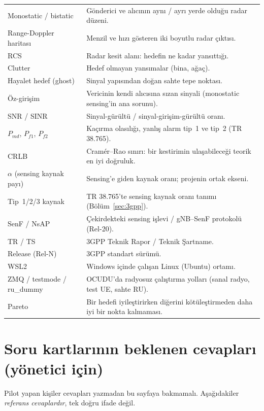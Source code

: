 \begin{xltabular}{\textwidth}{@{}p{3.2cm}X@{}}
Monostatic / bistatic & Gönderici ve alıcının aynı / ayrı yerde olduğu radar düzeni. \\
Range-Doppler haritası & Menzil ve hızı gösteren iki boyutlu radar çıktısı. \\
RCS & Radar kesit alanı: hedefin ne kadar yansıttığı. \\
Clutter & Hedef olmayan yansımalar (bina, ağaç). \\
Hayalet hedef (ghost) & Sinyal yapısından doğan sahte tepe noktası. \\
Öz-girişim & Vericinin kendi alıcısına sızan sinyali (monostatic sensing'in ana sorunu). \\
SNR / SINR & Sinyal-gürültü / sinyal-girişim-gürültü oranı. \\
$P_{md}$, $P_{f1}$, $P_{f2}$ & Kaçırma olasılığı, yanlış alarm tip~1 ve tip~2 (TR 38.765). \\
CRLB & Cramér--Rao sınırı: bir kestirimin ulaşabileceği teorik en iyi doğruluk. \\
$\alpha$ (sensing kaynak payı) & Sensing'e giden kaynak oranı; projenin ortak ekseni. \\
Tip~1/2/3 kaynak & TR 38.765'te sensing kaynak oranı tanımı (Bölüm~\ref{sec:3gpp}). \\
SenF / NsAP & Çekirdekteki sensing işlevi / gNB--SenF protokolü (Rel-20). \\
TR / TS & 3GPP Teknik Rapor / Teknik Şartname. \\
Release (Rel-N) & 3GPP standart sürümü. \\
WSL2 & Windows içinde çalışan Linux (Ubuntu) ortamı. \\
ZMQ / testmode / ru\_dummy & OCUDU'da radyosuz çalıştırma yolları (sanal radyo, test UE, sahte RU). \\
Pareto & Bir hedefi iyileştirirken diğerini kötüleştirmeden daha iyi bir nokta kalmaması. \\
\bottomrule
\end{xltabular}
\endgroup

\section{Soru kartlarının beklenen cevapları (yönetici için)}\label{ek:cevap}

\begin{dikkat}
Pilot yapan kişiler cevapları yazmadan bu sayfaya bakmamalı. Aşağıdakiler \emph{referans cevaplardır}, tek doğru ifade değil.
\end{dikkat}

